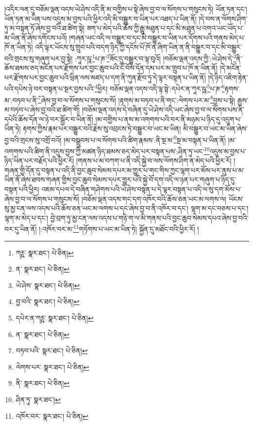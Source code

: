 །འདིར་ལན་དུ་བཅོམ་ལྡན་འདས་ཡེ་ཤེས་འདི་ནི་མ་བགྱིས་པ་སྟེ་ཞེས་བྱ་བ་ལ་སོགས་པ་གསུངས་ཏེ། ཡོན་ཏན་དང་། ཡོན་ཏན་མ་ཡིན་པས་འདུས་མ་བྱས་པའི་ཕྱིར་འདི་མི་བསྒྱུར་བ་ཡིན་པར་འཐད་པ་ཡིན་ནོ། །དེ་བས་ན་ལོགས་ཤིག་ཏུ་མ་བསྟན་ཏོ་ཞེས་བྱ་བའི་ཐ་ཚིག་སྟེ། ཟག་པ་མེད་པའི་ཆོས་ཀྱི་རྒྱུ་མཐུན་པ་དང་མི་མཐུན་པ་འགའ་ཡང་ཡོད་པ་མ་ཡིན་ནོ་ཞེས་དགོངས་པའོ། །གཞན་ཡང་འདི་ལ་བསྒྱུར་བ་དང་མི་བསྒྱུར་བ་ཡིན་པར་དོགས་པའི་གནས་མེད་པ་ཁོ་ན་ཡིན་ཏེ། འདི་ལྟར་ཡོངས་སུ་གྲུབ་པའི་བདག་ཉིད་ཀྱི་དངོས་པོ་ཁོ་ན་ཞིག་ཡིན་ན་ནི་བསྒྱུར་བ་དང་མི་བསྒྱུར་བའི་གྲངས་སུ་གཞུག་པར་བྱ་སྟེ། :ཀཱར་ཥཱ་\footnote{ཀཪྵ་  སྣར་ཐང་།  པེ་ཅིན། }པ་ཎ་\footnote{ན་  སྣར་ཐང་།  པེ་ཅིན། }ཟོང་དུ་བསྒྱུར་བ་ལྟ་བུའོ། །བཅོམ་ལྡན་འདས་ཀྱི་:ཡེ་ཤེས་དེ་\footnote{ཡེ་ཤེས་  སྣར་ཐང་།  པེ་ཅིན། }ནི་ཆོས་ཐམས་ཅད་མངོན་པར་རྫོགས་པར་བྱང་ཆུབ་པའི་ངོ་བོས་དོན་དམ་པར་མ་གྲུབ་པ་ཁོ་ན་ཡིན་ནོ། །དེ་མངོན་པར་རྫོགས་པར་བྱང་ཆུབ་པའི་ཕྲིན་ལས་མཛད་པ་དག་ནི་ཀུན་རྫོབ་ཏུ་དེ་ལྟར་བསྟན་པ་ཡིན་ནོ། །དེ་ཉིད་འཇིག་རྟེན་པའི་དཔེས་ཉེ་བར་བསྟན་པ་སྔར་བྱས་པའི་\footnote{བྱ་བའི་  སྣར་ཐང་།  པེ་ཅིན། }ཕྱིར། བཅོམ་ལྡན་འདས་འདི་ལྟ་སྟེ་:དཔེར་ན་ཀཱར་ཥཱ་\footnote{དཔེར་ན་ཀཪྵ་  སྣར་ཐང་།  པེ་ཅིན། }པ་ཎ་\footnote{ན་  སྣར་ཐང་།  པེ་ཅིན། }རྟགས་མ་:བཏབ་པ་ནི་\footnote{བཏབ་པའི་  སྣར་ཐང་།  པེ་ཅིན། }ཞེས་བྱ་བ་ལ་སོགས་པ་གསུངས་སོ། །རྟགས་མ་བཏབ་པ་ནི་གང་:ལེགས་པར་མ་\footnote{ལེགས་པར་  སྣར་ཐང་།  པེ་ཅིན། }བྱས་པ་སྟེ། རྒྱས་མ་བཏབ་པ་ཞེས་བྱ་བའི་ཐ་ཚིག་གོ། །བཅོམ་ལྡན་འདས་དེ་བཞིན་དུ་ཡེ་ཤེས་འདི་ཡང་ཞེས་བྱ་བ་ལ་སོགས་པས་ནི་དཔེའི་ཆོས་དོན་ལ་ཉེ་བར་སྦྱོར་བ་ཡིན་ནོ། །མ་བགྱིས་པ་ནས་མ་འགགས་པའི་བར་ནི་མཉམ་པ་ཉིད་དུ་འདུག་པ་ཡིན་ཏེ། རྟགས་ཀྱིས་རྣམ་པར་བསྒྱུར་བའི་རྗེས་སུ་འབྲངས་ཏེ་བསྒྱུར་བ་ཡང་མ་ཡིན། མི་བསྒྱུར་བ་ཡང་མ་ཡིན་ཞེས་བྱ་བའི་གྲངས་སུ་འགྲོ་བའོ། །མ་བསྒྲུབས་པ་ལ་སོགས་པའི་ཚིག་རྣམས་:ནི་སྔ་མ་\footnote{ནི་  སྣར་ཐང་།  པེ་ཅིན། }སྔ་མ་བསྟན་པ་ཡིན་ནོ། །མ་འགགས་པའི་ཚིག་ནི་འདུས་བྱས་ཀྱི་མཚན་ཉིད་ཐམས་ཅད་མེད་པར་བསྟན་པས་:ཤིན་ཏུ་ཡང་\footnote{ཤིན་ཏུ་  སྣར་ཐང་། }འདུས་མ་བྱས་པ་ཉིད་ཡིན་པར་བརྗོད་པའི་ཕྱིར་རོ། །གནས་པ་མ་བཀག་པ་ནི་འདི་སྐྱེ་བ་ལས་ལོགས་ཤིག་ན་མེད་པའི་ཕྱིར་རོ། །གཞན་གྱི་དོན་དུ་བསྟན་པ་འདི་ནི་བྱང་ཆུབ་སེམས་དཔར་མ་གྱུར་པ་གང་གིས་ཀྱང་ལྷག་པར་མོས་པར་ནུས་པ་མ་ཡིན་ནོ་ཞེས་ཐབས་གཞན་གྱིས་བྱང་ཆུབ་སེམས་དཔར་གྱུར་པའི་སྐྱེ་བོ་དག་འདི་ལ་ཉན་པར་གཞུག་པ་ཉིད་དུ་བསྟན་པའི་ཕྱིར། འཇམ་དཔལ་དེ་བཞིན་གཤེགས་པའི་ཡེ་ཤེས་བསྟན་པ་དེ་ལྟར་བསྟན་པ་འདི་ལ་སུ་དག་མོས་པ་ཞེས་བྱ་བ་ལ་སོགས་པ་གསུངས་སོ། །བཅོམ་ལྡན་འདས་གང་དག་འཁོར་བའི་ཆོས་ཅན་ཡང་མ་ལགས་ལ། ཡོངས་སུ་མྱ་ངན་ལས་འདས་པའི་ཆོས་ཅན་ཡང་མ་ལགས་པ་དང་ཞེས་བྱ་བ་ནི་འཁོར་བ་དང་། ལྷག་མ་དང་བཅས་པ་དང་། ལྷག་མ་མེད་པ་དང་། བྱེ་བྲག་ཏུ་མྱ་ངན་ལས་འདས་པ་གཉི་ག་ལ་མི་གནས་པའི་བྱང་ཆུབ་སེམས་དཔའ་ཞེས་བྱ་བའི་བར་དུ་ཡིན་ནོ། །:འཁོར་བར་མ་\footnote{འཁོར་བར་  སྣར་ཐང་།  པེ་ཅིན། }གཏོགས་པ་ཡང་མ་ཡིན་ཏེ། སྐྱོན་དུ་མཐོང་བའི་ཕྱིར་རོ། །
